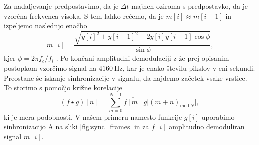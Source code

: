 \documentclass{article}
\begin{document}
Za nadaljevanje predpostavimo, da je $\Delta t$ majhen oziroma s predpostavko, da je vzorčna frekvenca visoka. S tem lahko rečemo, da je $m[i] \approx m[i-1]$ in izpeljemo naslednjo enačbo 
\begin{equation*}
	m[i] = \frac{\sqrt{y[i]^2 + y[i-1]^2-2y[i]y[i-1]\cos{\phi}}}{\sin{\phi}}\text{,}
\end{equation*}
kjer $\phi = 2\pi f_c/f_i$ \cite{bernardi}. Po končani amplitudni demodulaciji z že prej opisanim postopkom vzorčimo signal na $\SI{4160}{\hertz}$, kar je enako številu pikslov v eni sekundi.
Preostane še iskanje sinhronizacije v signalu, da najdemo začetek vsake vrstice. To storimo s pomočjo križne korelacije
\begin{equation*}
	(f \star g)[n] = \sum_{m=0}^{N-1} \overline{f[m]} \, g\bigl[(m+n)_{\text{mod}\, N}\bigr],
\end{equation*}
 ki je mera podobnosti. V našem primeru namesto funkcije $g[i]$ uporabimo sinhronizacijo A na sliki \ref{fig:sync_frames} in za $f[i]$ amplitudno demoduliran signal $m[i]$.
\end{document}

